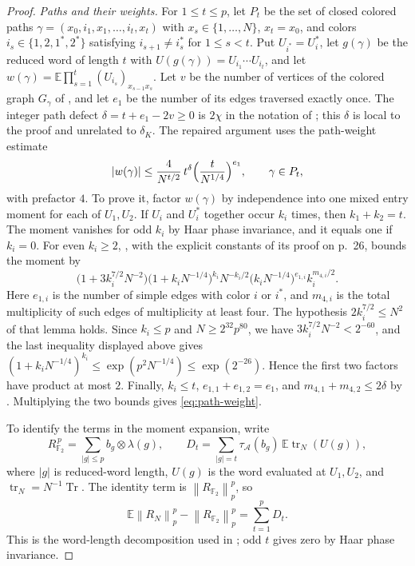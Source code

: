 \documentclass[11pt]{article}
\numberwithin{equation}{section}
\theoremstyle{boldremark}\newtheorem{remark}[theorem]{Remark}
\DeclareMathOperator{\Tr}{Tr}
\newcommand{\F}{\mathbb F}
\newcommand{\E}{\mathbb E}
\newcommand{\norm}[1]{\left\lVert #1\right\rVert}
\begin{document}
\begin{proof}
\emph{Paths and their weights.}
For $1\le t\le p$, let $P_t$ be the set of closed colored paths
$\gamma=(x_0,i_1,x_1,\dots,i_t,x_t)$ with
$x_s\in\{1,\dots,N\}$, $x_t=x_0$, and colors
$i_s\in\{1,2,1^*,2^*\}$ satisfying $i_{s+1}\ne i_s^*$ for $1\le s<t$.
Put $U_{i^*}=U_i^*$, let $g(\gamma)$ be the reduced word of length $t$
with $U(g(\gamma))=U_{i_1}\cdots U_{i_t}$, and let
$w(\gamma)=\E\prod_{s=1}^{t}(U_{i_s})_{x_{s-1}x_s}$. Let $v$ be the number of vertices of the colored graph $G_\gamma$ of
\cite[Definition~5.2]{BC}, and let $e_1$ be the number of its edges
traversed exactly once. The integer path defect
$\delta=t+e_1-2v\ge0$ is $2\chi$ in the notation of \cite[equation~(26)]{BC}; this
$\delta$ is local to the proof and unrelated to $\delta_K$.
The repaired argument uses the path-weight estimate
\begin{equation}
 |w(\gamma)|\le\frac{4}{N^{t/2}}\,t^{\delta}
  \Bigl(\frac{t}{N^{1/4}}\Bigr)^{e_1},
 \qquad\gamma\in P_t,
 \label{eq:path-weight}
\end{equation}
with prefactor $4$. To prove it, factor $w(\gamma)$ by independence into one mixed entry
moment for each of $U_1,U_2$. If $U_i$ and $U_i^*$ together occur
$k_i$ times, then $k_1+k_2=t$. The moment vanishes for odd $k_i$ by
Haar phase invariance, and it equals one if $k_i=0$. For even
$k_i\ge2$, \cite[Lemma~5.4]{BC}, with the explicit constants of its
proof on p.~26, bounds the moment by
\[
 \bigl(1+3k_i^{7/2}N^{-2}\bigr)\bigl(1+k_iN^{-1/4}\bigr)^{k_i}
 N^{-k_i/2}\bigl(k_iN^{-1/4}\bigr)^{e_{1,i}}k_i^{m_{4,i}/2}.
\]
Here $e_{1,i}$ is the number of simple edges with color $i$ or $i^*$,
and $m_{4,i}$ is the total multiplicity of such edges of multiplicity
at least four. The hypothesis $2k_i^{7/2}\le N^2$ of that lemma
holds. Since $k_i\le p$ and $N\ge2^{32}p^{80}$, we have
$3k_i^{7/2}N^{-2}<2^{-60}$, and the last inequality displayed above
gives $(1+k_iN^{-1/4})^{k_i}\le\exp(p^2N^{-1/4})\le\exp(2^{-26})$.
Hence the first two factors have product at most $2$.
Finally, $k_i\le t$, $e_{1,1}+e_{1,2}=e_1$, and
$m_{4,1}+m_{4,2}\le2\delta$ by \cite[equation~(27)]{BC}.
Multiplying the two bounds gives \eqref{eq:path-weight}.

To identify the terms in the moment expansion, write
\[
 R_{\F_2}^{\,p}=\sum_{|g|\le p}b_g\otimes\lambda(g),
 \qquad
 D_t=\sum_{|g|=t}\tau_{\mathcal A}(b_g)\,
                \E\operatorname{tr}_N(U(g)),
\]
where $|g|$ is reduced-word length, $U(g)$ is the word evaluated
at $U_1,U_2$, and $\operatorname{tr}_N=N^{-1}\Tr$.
The identity term is $\norm{R_{\F_2}}_p^p$, so
\[
 \E\norm{R_N}_p^p-\norm{R_{\F_2}}_p^p=\sum_{t=1}^p D_t.
\]
This is the word-length decomposition used in
\cite[equation~(21)]{BC}; odd $t$ gives zero by Haar phase invariance.


\end{proof}
\end{document}
